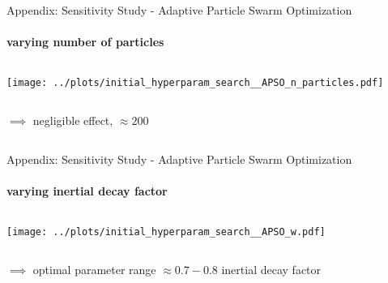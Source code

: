 \documentclass[11pt,aspectratio=169]{beamer}
\begin{document}
\begin{closingframe}{Appendix: Sensitivity Study - Adaptive Particle Swarm Optimization}
    \framesubtitle{varying \textbf{number of particles}}

    \begin{columns}
    \begin{column}{0.8\textwidth}
        \texttt{[image: ../plots/initial\_hyperparam\_search\_\_APSO\_n\_particles.pdf]}
    \end{column}
    \end{columns}

    \begin{columns}
        \begin{column}{0.8\textwidth}
            $\implies$ negligible effect, $\approx 200$
        \end{column}
        \begin{column}{0.1\textwidth}
            \tiny{}
        \end{column}
    \end{columns}
\end{closingframe}

%
%

\begin{closingframe}{Appendix: Sensitivity Study - Adaptive Particle Swarm Optimization}
    \framesubtitle{varying \textbf{inertial decay factor}}

    \begin{columns}
    \begin{column}{0.8\textwidth}
        \texttt{[image: ../plots/initial\_hyperparam\_search\_\_APSO\_w.pdf]}
    \end{column}
    \end{columns}

    \begin{columns}
        \begin{column}{0.8\textwidth}
            $\implies$ optimal parameter range $\approx 0.7 - 0.8$ inertial decay factor
        \end{column}
        \begin{column}{0.1\textwidth}
            \tiny{}
        \end{column}
    \end{columns}
\end{closingframe}
\end{document}
